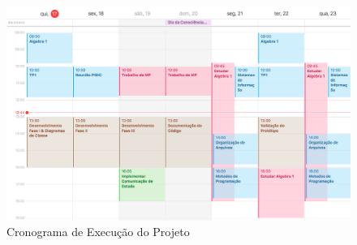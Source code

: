 \documentclass[a4paper, 12pt]{article}
\begin{document}
	\begin{figure}[H]
		\centering
		\includegraphics[scale=0.4]{cronograma.png}
		\caption{Cronograma de Execução do Projeto}
	\end{figure}
	
\end{document}
